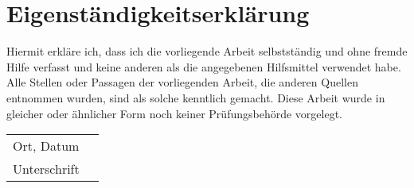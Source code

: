 \section*{Eigenständigkeitserklärung}

\vspace{1cm}

Hiermit erkläre ich, dass ich die vorliegende Arbeit selbstständig und ohne fremde Hilfe verfasst und keine anderen als die angegebenen Hilfsmittel verwendet habe. Alle Stellen oder Passagen der vorliegenden Arbeit, die anderen Quellen entnommen wurden, sind als solche kenntlich gemacht. Diese Arbeit wurde in gleicher oder ähnlicher Form noch keiner Prüfungsbehörde vorgelegt.

\vspace{2cm}

\noindent
\begin{tabular}{ll}
\cline{1-1}
Ort, Datum & \\[1cm]
\cline{1-1}
Unterschrift & \\
\end{tabular}

%
%
